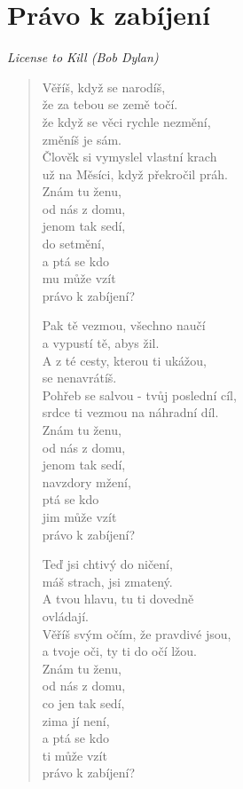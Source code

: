 \section*{Právo k zabíjení}

\textit{License to Kill (Bob Dylan)}

\begin{verse}
 Věříš, když se narodíš,\\ 
 že za tebou se země točí.\\
 že když se věci rychle nezmění, \\
 změníš je sám.\\
 Člověk si vymyslel vlastní krach\\
 už na Měsíci, když překročil práh.\\
 Znám tu ženu,\\
 od nás z domu,\\
 jenom tak sedí,\\
 do setmění,\\
 a ptá se kdo \\
 mu může vzít \\
 právo k zabíjení?
 
 Pak tě vezmou, všechno naučí \\
 a vypustí tě, abys žil. \\
 A z té cesty, kterou ti ukážou,  \\
 se nenavrátíš. \\
 Pohřeb se salvou - tvůj poslední cíl, \\
 srdce ti vezmou na náhradní díl. \\
 Znám tu ženu, \\
 od nás z domu, \\
 jenom tak sedí, \\
 navzdory mžení, \\
 ptá se kdo \\
 jim může vzít \\
 právo k zabíjení?
 
 Teď jsi chtivý do ničení, \\
 máš strach, jsi zmatený. \\
 A tvou hlavu, tu ti dovedně \\
 ovládají. \\
 Věříš svým očím, že pravdivé jsou, \\
 a tvoje oči, ty ti do očí lžou. \\
 Znám tu ženu, \\
 od nás z domu, \\
 co jen tak sedí, \\
 zima jí není, \\
 a ptá se kdo \\
 ti může vzít \\
 právo k zabíjení?
 

\end{verse}
